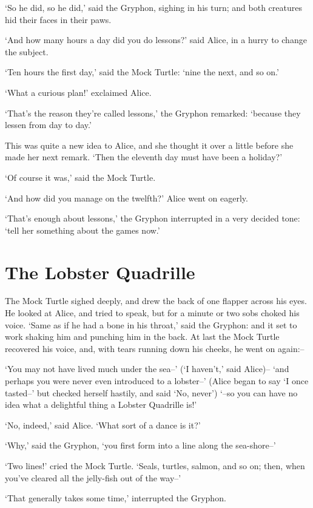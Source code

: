 \documentclass[statementpaper,twoside,openany]{memoir}
\begin{document}
`So he did, so he did,' said the Gryphon, sighing in his turn; and both creatures hid their faces in their paws.

`And how many hours a day did you do lessons?' said Alice, in a hurry to change the subject.

`Ten hours the first day,' said the Mock Turtle: `nine the next, and so on.'

`What a curious plan!' exclaimed Alice.

`That's the reason they're called lessons,' the Gryphon remarked: `because they lessen from day to day.'

This was quite a new idea to Alice, and she thought it over a little before she made her next remark. `Then the eleventh day must have been a holiday?'

`Of course it was,' said the Mock Turtle.

`And how did you manage on the twelfth?' Alice went on eagerly.

`That's enough about lessons,' the Gryphon interrupted in a very decided tone: `tell her something about the games now.'

\chapter{The Lobster Quadrille}

The Mock Turtle sighed deeply, and drew the back of one flapper across his eyes. He looked at Alice, and tried to speak, but for a minute or two sobs choked his voice. `Same as if he had a bone in his throat,' said the Gryphon: and it set to work shaking him and punching him in the back. At last the Mock Turtle recovered his voice, and, with tears running down his cheeks, he went on again:--

`You may not have lived much under the sea--' (`I haven't,' said Alice)-- `and perhaps you were never even introduced to a lobster--' (Alice began to say `I once tasted--' but checked herself hastily, and said `No, never') `--so you can have no idea what a delightful thing a Lobster Quadrille is!'

`No, indeed,' said Alice. `What sort of a dance is it?'

`Why,' said the Gryphon, `you first form into a line along the sea-shore--'

`Two lines!' cried the Mock Turtle. `Seals, turtles, salmon, and so on; then, when you've cleared all the jelly-fish out of the way--'

`That generally takes some time,' interrupted the Gryphon.
\end{document}
